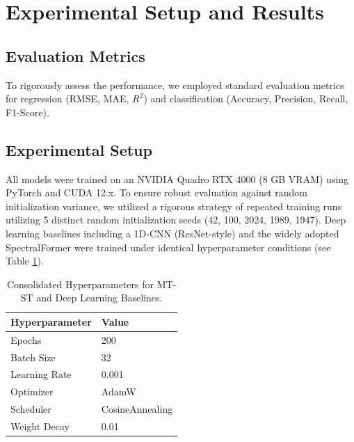 \documentclass[pdflatex,sn-mathphys-num]{sn-jnl}
\begin{document}
\section{Experimental Setup and Results}\label{sec:experiments}

\subsection{Evaluation Metrics}
To rigorously assess the performance, we employed standard evaluation metrics for regression (RMSE, MAE, $R^2$) and classification (Accuracy, Precision, Recall, F1-Score). 

\subsection{Experimental Setup}
All models were trained on an NVIDIA Quadro RTX 4000 (8 GB VRAM) using PyTorch and CUDA 12.x. To ensure robust evaluation against random initialization variance, we utilized a rigorous strategy of repeated training runs utilizing 5 distinct random initialization seeds (42, 100, 2024, 1989, 1947). Deep learning baselines including a 1D-CNN (ResNet-style) and the widely adopted SpectralFormer \cite{hong2021spectralformer} were trained under identical hyperparameter conditions (see Table \ref{tab:hyperparameters}).

\begin{table}[ht]
\centering
\caption{Consolidated Hyperparameters for MT-ST and Deep Learning Baselines.}\label{tab:hyperparameters}
\begin{tabular}{@{}ll@{}}
\toprule
\textbf{Hyperparameter} & \textbf{Value} \\
\midrule
Epochs & 200 \\
Batch Size & 32 \\
Learning Rate & 0.001 \\
Optimizer & AdamW \\
Scheduler & CosineAnnealing \\
Weight Decay & 0.01 \\
\bottomrule
\end{tabular}
\end{table}
\end{document}
